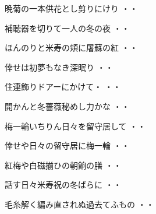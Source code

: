 \begin{shiika}晩菊の一本供花とし剪りにけり
\hfill{・・}\end{shiika}
\vspace{0.6cm}
\begin{shiika}補聴器を切りて一人の冬の夜
\hfill{・・}\end{shiika}
\vspace{0.6cm}
\begin{shiika}ほんのりと米寿の頬に屠蘇の紅
\hfill{・・}\end{shiika}
\vspace{0.6cm}
\begin{shiika}倖せは初夢もなき深眠り
\hfill{・・}\end{shiika}
\vspace{0.6cm}
\begin{shiika}住連飾りドアーにかけて・
\hfill{・・}\end{shiika}
\vspace{0.6cm}
\begin{shiika}開かんと冬薔薇秘めし力かな
\hfill{・・}\end{shiika}
\vspace{0.6cm}
\begin{shiika}梅一輪いちりん日々を留守居して
\hfill{・・}\end{shiika}
\vspace{0.6cm}
\begin{shiika}倖せや日々の留守居に梅一輪
\hfill{・・}\end{shiika}
\vspace{0.6cm}
\begin{shiika}紅梅や白磁揃ひの朝餉の膳
\hfill{・・}\end{shiika}
\vspace{0.6cm}
\begin{shiika}話す日々米寿祝の冬ばらに
\hfill{・・}\end{shiika}
\vspace{0.6cm}
\begin{shiika}毛糸解く編み直されぬ過去てふもの
\hfill{・・}\end{shiika}
\vspace{0.6cm}
